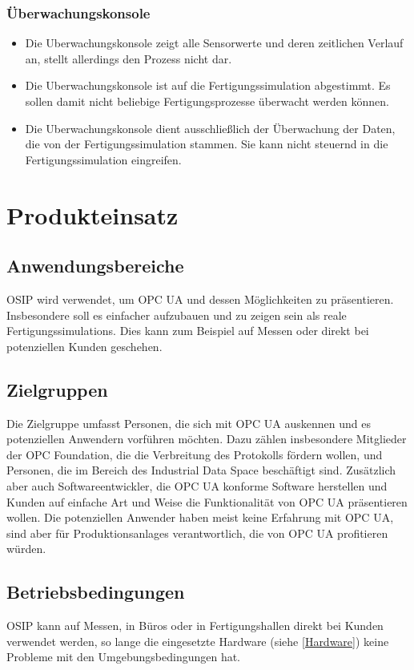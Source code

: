 \documentclass[parskip=full]{scrartcl}
\begin{document}
\subsubsection{Überwachungskonsole}
\begin{itemize}
  \item Die \gls{Uberwachungskonsole} zeigt alle Sensorwerte und deren zeitlichen Verlauf an, stellt allerdings den Prozess nicht dar.
  \item Die \gls{Uberwachungskonsole} ist auf die \gls{Fertigungssimulation} abgestimmt. Es sollen damit nicht beliebige
    Fertigungsprozesse \"uberwacht werden k\"onnen.
  \item Die \gls{Uberwachungskonsole} dient ausschlie{\ss}lich der \"Uberwachung der Daten, die von der \gls{Fertigungssimulation}
    stammen. Sie kann nicht steuernd in die \gls{Fertigungssimulation} eingreifen.
\end{itemize}

\newpage
\section{Produkteinsatz}
\subsection{Anwendungsbereiche}
OSIP wird verwendet, um \gls{OPC UA} und dessen Möglichkeiten zu präsentieren.
Insbesondere soll es einfacher aufzubauen und zu zeigen sein als reale \glspl{Fertigungssimulation}.
Dies kann zum Beispiel auf Messen oder direkt bei potenziellen Kunden geschehen.

\subsection{Zielgruppen}
Die Zielgruppe umfasst Personen, die sich mit \gls{OPC UA} auskennen und es potenziellen Anwendern vorführen möchten.
Dazu zählen insbesondere Mitglieder der OPC Foundation, die die Verbreitung des Protokolls fördern wollen, und Personen,
die im Bereich des \gls{Industrial Data Space} beschäftigt sind.
Zusätzlich aber auch Softwareentwickler, die \gls{OPC UA} konforme Software herstellen und Kunden auf einfache Art und
Weise die Funktionalität von \gls{OPC UA} präsentieren wollen.
Die potenziellen Anwender haben meist keine Erfahrung mit \gls{OPC UA}, sind aber für \glspl{Produktionsanlage} verantwortlich,
die von \gls{OPC UA} profitieren würden.

\subsection{Betriebsbedingungen}
OSIP kann auf Messen, in Büros oder in Fertigungshallen direkt bei Kunden verwendet werden,
so lange die eingesetzte Hardware (siehe \ref{Hardware}) keine Probleme mit den Umgebungsbedingungen hat.
\end{document}
